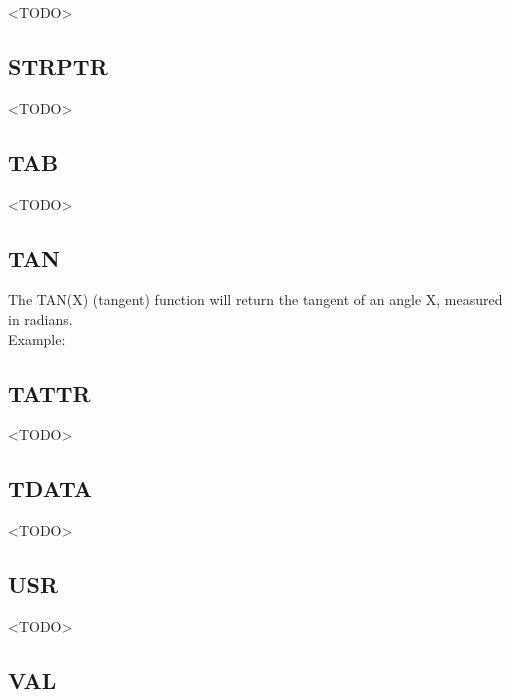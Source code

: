 <TODO>

\subsection{STRPTR}

<TODO>

\subsection{TAB}

<TODO>

\subsection{TAN}

The {\ttfamily TAN(X)} (tangent) function will return the tangent of an angle
{\ttfamily X}, measured in radians.\\

Example:\\


\subsection{TATTR}

<TODO>

\subsection{TDATA}

<TODO>

\subsection{USR}

<TODO>

\subsection{VAL}

